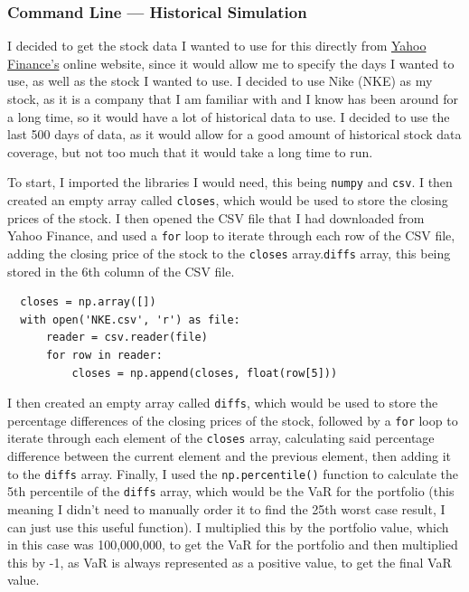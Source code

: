 \documentclass{article}
\begin{document}
\subsubsection{Command Line --- Historical Simulation}
I decided to get the stock data I wanted to use for this directly from \href{https://finance.yahoo.com/}{Yahoo Finance's} online website, since it would allow me to specify the days I wanted to use, as well as the stock I wanted to use. I decided to use Nike (NKE) as my stock, as it is a company that I am familiar with and I know has been around for a long time, so it would have a lot of historical data to use. I decided to use the last 500 days of data, as it would allow for a good amount of historical stock data coverage, but not too much that it would take a long time to run.\\\vspace{0.3cm}

To start, I imported the libraries I would need, this being \texttt{numpy} and \texttt{csv}. I then created an empty array called \texttt{closes}, which would be used to store the closing prices of the stock. I then opened the CSV file that I had downloaded from Yahoo Finance, and used a \texttt{for} loop to iterate through each row of the CSV file, adding the closing price of the stock to the \texttt{closes} array.\texttt{diffs} array, this being stored in the 6th column of the CSV file.\\\vspace{0.3cm}
\begin{verbatim}
  closes = np.array([])
  with open('NKE.csv', 'r') as file:
      reader = csv.reader(file)
      for row in reader:
          closes = np.append(closes, float(row[5]))
  \end{verbatim}

I then created an empty array called \texttt{diffs}, which would be used to store the percentage differences of the closing prices of the stock, followed by a \texttt{for} loop to iterate through each element of the \texttt{closes} array, calculating said percentage difference between the current element and the previous element, then adding it to the \texttt{diffs} array. Finally, I used the \texttt{np.percentile()} function to calculate the 5th percentile of the \texttt{diffs} array, which would be the VaR for the portfolio (this meaning I didn't need to manually order it to find the 25th worst case result, I can just use this useful function). I multiplied this by the portfolio value, which in this case was 100,000,000, to get the VaR for the portfolio and then multiplied this by -1, as VaR is always represented as a positive value, to get the final VaR value.\\\vspace{0.3cm}
\end{document}
